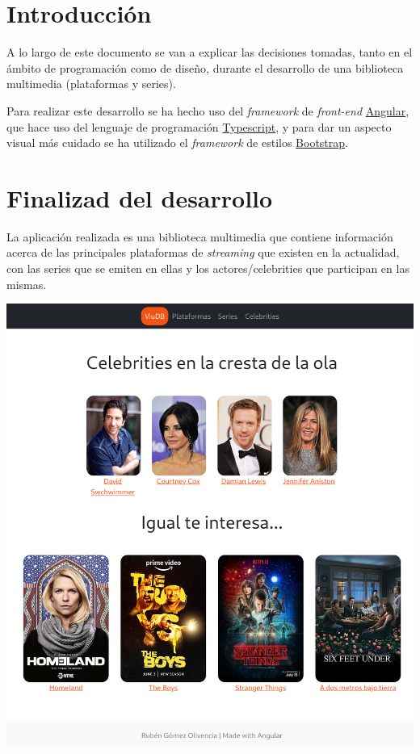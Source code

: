 \documentclass{\ClassPath/viu-tfm-template}
\begin{document}
    \graphicspath{{../../VIU_TFM_LaTeX_template/}}

    \coverpage

    \tableofcontents

\chapter{Introducción}

A lo largo de este documento se van a explicar las decisiones tomadas, tanto en el ámbito de programación como de diseño, durante el desarrollo de una biblioteca multimedia (plataformas y series).

Para realizar este desarrollo se ha hecho uso del \textit{framework} de \textit{front-end} \href{https://angular.io/}{Angular}, que hace uso del lenguaje de programación \href{https://www.typescriptlang.org/}{Typescript}, y para dar un aspecto visual más cuidado se ha utilizado el \textit{framework} de estilos \href{https://getbootstrap.com/}{Bootstrap}.

\chapter{Finalizad del desarrollo}

La aplicación realizada es una biblioteca multimedia que contiene información acerca de las principales plataformas de \textit{streaming} que existen en la actualidad, con las series que se emiten en ellas y los actores/celebrities que participan en las mismas.

\begin{center}
    \includegraphics[frame,width=0.6\linewidth]{img/inicio.png}
\end{center}
\end{document}
